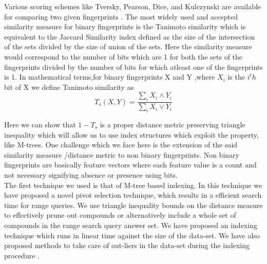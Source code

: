 Various scoring schemes like Tversky, Pearson, Dice, and Kulczynski are available for comparing two given fingerprints \cite{willett2006similarity,swamidass2007bounds}. The most widely used and accepted similarity measure for binary fingerprints is the Tanimoto similarity which is equivalent to the Jaccard Similarity index defined as the size of the intersection of the sets divided by the size of union of the sets. Here the similarity measure would correspond to the number of bits which are 1 for both the sets of the fingerprints divided by the number of bits for which atleast one of the fingerprints is 1. In mathematical terms,for binary fingerprints X and Y ,where $X_i$ is the $i^th$ bit of X we define Tanimoto similarity as	
\begin{equation}
 T_s(X,Y) = \frac{\sum \limits_i X_i \wedge Y_i}
{\sum \limits_i X_i \vee Y_i} 
\end{equation}	

Here we can show that $1-T_s$ is a proper distance metric preserving triangle inequality which will allow us to use index structures which exploit the property, like M-trees. One challenge which we face here is the extension of the said similarity measure /distance metric to non binary fingerprints. Non binary fingerprints are basically feature vectors where each feature value is a count and not necessary signifying absence or presence using bits. \\

%

The first technique we used is that of M-tree \cite{ciaccia1997indexing} based indexing. In this technique we have proposed a novel pivot selection technique, which results in a efficient search time for range queries. We use triangle inequality bounds on the distance measure to effectively prune out compounds or alternatively include a whole set of compounds in the range search query answer set. We have proposed an indexing technique which runs in linear time against the size of the data-set. We have also proposed methods to take care of out-liers in the data-set during the indexing procedure .\\

